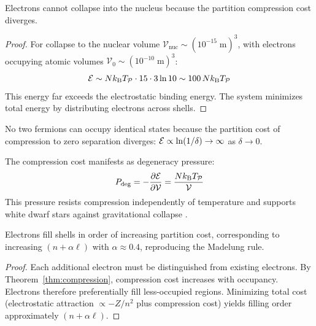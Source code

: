 \begin{corollary}
\label{cor:electron_stability}
Electrons cannot collapse into the nucleus because the partition compression cost diverges.
\end{corollary}

\begin{proof}
For collapse to the nuclear volume $\mathcal{V}_{\mathrm{nuc}} \sim (10^{-15}\;\mathrm{m})^3$, with electrons occupying atomic volumes $\mathcal{V}_0 \sim (10^{-10}\;\mathrm{m})^3$:
\begin{equation}
    \mathcal{E} \sim N k_{\mathrm{B}} T_{\mathcal{P}} \cdot 15 \cdot 3\ln 10 \sim 100\, N k_{\mathrm{B}} T_{\mathcal{P}}
\end{equation}
This energy far exceeds the electrostatic binding energy. The system minimizes total energy by distributing electrons across shells.
\end{proof}

\begin{corollary}
\label{cor:pauli}
No two fermions can occupy identical states because the partition cost of compression to zero separation diverges: $\mathcal{E} \propto \ln(1/\delta) \to \infty$ as $\delta \to 0$.
\end{corollary}

\begin{corollary}
\label{cor:degeneracy}
The compression cost manifests as degeneracy pressure:
\begin{equation}
    P_{\mathrm{deg}} = -\frac{\partial\mathcal{E}}{\partial\mathcal{V}} = \frac{Nk_{\mathrm{B}} T_{\mathcal{P}}}{\mathcal{V}}
\end{equation}
This pressure resists compression independently of temperature and supports white dwarf stars against gravitational collapse \cite{chandrasekhar1931}.
\end{corollary}

\begin{corollary}
\label{cor:aufbau}
Electrons fill shells in order of increasing partition cost, corresponding to increasing $(n + \alpha\ell)$ with $\alpha \approx 0.4$, reproducing the Madelung rule.
\end{corollary}

\begin{proof}
Each additional electron must be distinguished from existing electrons. By Theorem~\ref{thm:compression}, compression cost increases with occupancy. Electrons therefore preferentially fill less-occupied regions. Minimizing total cost (electrostatic attraction $\propto -Z/n^2$ plus compression cost) yields filling order approximately $(n + \alpha\ell)$.
\end{proof}

